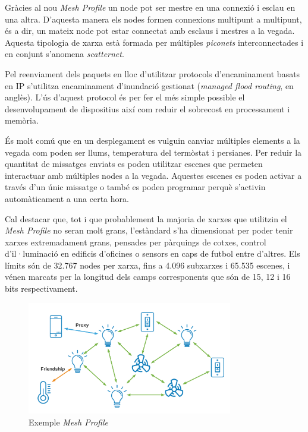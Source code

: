 Gràcies al nou \textit{Mesh Profile} un node pot ser mestre en una connexió i esclau en una altra.
D'aquesta manera els nodes formen connexions multipunt a multipunt, és a dir, un mateix node pot estar connectat amb esclaus i mestres a la vegada.
Aquesta tipologia de xarxa està formada per múltiples \textit{piconets} interconnectades i en conjunt s'anomena \textit{scatternet}.

Pel reenviament dels paquets en lloc d'utilitzar protocols d'encaminament basats en IP s'utilitza encaminament d’inundació gestionat (\textit{managed flood routing}, en anglès).
L'ús d'aquest protocol és per fer el més simple possible el desenvolupament de dispositius així com reduir el sobrecost en processament i memòria.

És molt comú que en un desplegament es vulguin canviar múltiples elements a la vegada com poden ser llums, temperatura del termòstat i persianes.
Per reduir la quantitat de missatges enviats es poden utilitzar escenes que permeten interactuar amb múltiples nodes a la vegada.
Aquestes escenes es poden activar a través d'un únic missatge o també es poden programar perquè s'activin automàticament a una certa hora.

Cal destacar que, tot i que probablement la majoria de xarxes que utilitzin el \textit{Mesh Profile} no seran molt grans, l'estàndard s'ha dimensionat per poder tenir xarxes extremadament grans, pensades per pàrquings de cotxes, control d'il·luminació en edificis d'oficines o sensors en caps de futbol entre d'altres.
Els límits són de 32.767 nodes per xarxa, fins a 4.096 subxarxes i 65.535 escenes, i vénen marcats per la longitud dels camps corresponents que són de 15, 12 i 16 bits respectivament.

\begin{figure}[!h]
	\begin{center}
		\includegraphics[width=0.8\textwidth]{./images/mesh_profile_features.png}
		\caption{Exemple \textit{Mesh Profile} \cite{Mesh Profile}}
	\end{center}
\end{figure}

